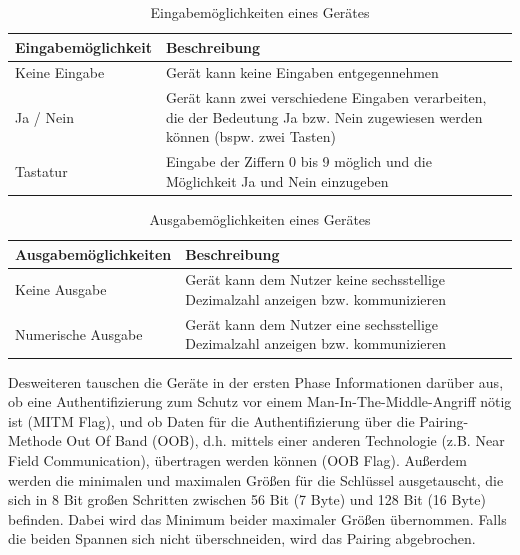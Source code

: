 \begin{table}[H]
    \begin{tabularx}{\textwidth}{|l|X|}
    \hline
    \textbf{Eingabemöglichkeit} & \textbf{Beschreibung} \\
    \hline
    Keine Eingabe & Gerät kann keine Eingaben entgegennehmen \\
    \hline
    Ja / Nein & Gerät kann zwei verschiedene Eingaben verarbeiten, die der Bedeutung Ja bzw. Nein zugewiesen werden können (bspw. zwei Tasten) \\
    \hline
    Tastatur & Eingabe der Ziffern 0 bis 9 möglich und die Möglichkeit Ja und Nein einzugeben \\
    \hline
    \end{tabularx}
    \caption[Eingabemöglichkeiten eines Gerätes]{Eingabemöglichkeiten eines Gerätes \cite{BtSpec4.0_1965}}
    \label{tab: i caps geraet}
\end{table}

\begin{table}[H]
    \begin{tabularx}{\textwidth}{|l|X|}
    \hline
    \textbf{Ausgabemöglichkeiten} & \textbf{Beschreibung} \\
    \hline
    Keine Ausgabe & Gerät kann dem Nutzer keine sechsstellige Dezimalzahl anzeigen bzw. kommunizieren \\
    \hline
    Numerische Ausgabe & Gerät kann dem Nutzer eine sechsstellige Dezimalzahl anzeigen bzw. kommunizieren \\
    \hline
    \end{tabularx}
    \caption[Ausgabemöglichkeiten eines Gerätes]{Ausgabemöglichkeiten eines Gerätes \cite{BtSpec4.0_1965_b}}
    \label{tab: o caps geraet}
\end{table}

Desweiteren tauschen die Geräte in der ersten Phase Informationen darüber aus, ob eine Authentifizierung zum Schutz vor einem Man-In-The-Middle-Angriff nötig ist (MITM Flag), und ob Daten für die Authentifizierung über die Pairing-Methode Out Of Band (OOB), d.h. mittels einer anderen Technologie (z.B. Near Field Communication), übertragen werden können (OOB Flag). Außerdem werden die minimalen und maximalen Größen für die Schlüssel ausgetauscht, die sich in 8 Bit großen Schritten zwischen 56 Bit (7 Byte) und 128 Bit (16 Byte) befinden. Dabei wird das Minimum beider maximaler Größen übernommen. Falls die beiden Spannen sich nicht überschneiden, wird das Pairing abgebrochen.

